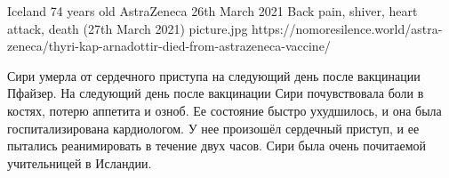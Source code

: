 {Iceland}
{74 years old}
{AstraZeneca}
{26th March 2021}
{Back pain, shiver, heart attack, death (27th March 2021)}
{picture.jpg}
{https://nomoresilence.world/astra-zeneca/thyri-kap-arnadottir-died-from-astrazeneca-vaccine/}
{
\cyr
Сири умерла от сердечного приступа на следующий день после вакцинации
Пфайзер. На следующий день после вакцинации Сири почувствовала боли в костях,
потерю аппетита и озноб. Ее состояние быстро ухудшилось, и она была
госпитализирована кардиологом. У нее произошёл сердечный приступ, и ее пытались
реанимировать в течение двух часов. Сири была очень почитаемой учительницей в
Исландии.

}
